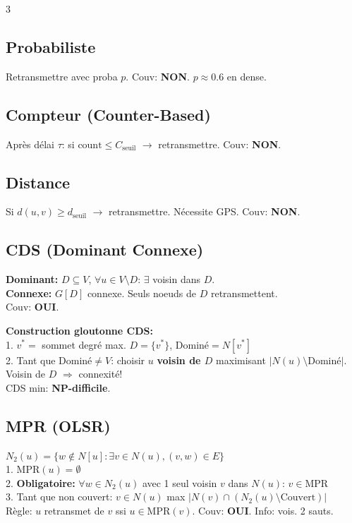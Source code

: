 \documentclass[a4paper,4pt]{article}
\begin{document}
\begin{multicols}{3}
\subsection{Probabiliste}
Retransmettre avec proba $p$. Couv: \textbf{NON}. $p\approx 0.6$ en dense.

\subsection{Compteur (Counter-Based)}
Apr\`es d\'elai $\tau$: si $\text{count}\leq C_{\text{seuil}}$ $\to$ retransmettre. Couv: \textbf{NON}.

\subsection{Distance}
Si $d(u,v)\geq d_{\text{seuil}}$ $\to$ retransmettre. N\'ecessite GPS. Couv: \textbf{NON}.

\subsection{CDS (Dominant Connexe)}
\textbf{Dominant:} $D\subseteq V$, $\forall u\in V\setminus D$: $\exists$ voisin dans $D$.\\
\textbf{Connexe:} $G[D]$ connexe. Seuls noeuds de $D$ retransmettent.\\
Couv: \textbf{OUI}.

\textbf{Construction gloutonne CDS:}\\
1. $v^*=$ sommet degr\'e max. $D=\{v^*\}$, Domin\'e$=N[v^*]$\\
2. Tant que Domin\'e$\neq V$: choisir $u$ \textbf{voisin de $D$} maximisant $|N(u)\setminus\text{Domin\'e}|$. Voisin de $D$ $\Rightarrow$ connexit\'e!\\
CDS min: \textbf{NP-difficile}.

\subsection{MPR (OLSR)}
$N_2(u)=\{w\notin N[u]: \exists v\in N(u), (v,w)\in E\}$\\
1. $\text{MPR}(u)=\emptyset$\\
2. \textbf{Obligatoire:} $\forall w\in N_2(u)$ avec 1 seul voisin $v$ dans $N(u)$: $v\in$MPR\\
3. Tant que non couvert: $v\in N(u)$ max $|N(v)\cap(N_2(u)\setminus\text{Couvert})|$\\
R\`egle: $u$ retransmet de $v$ ssi $u\in\text{MPR}(v)$. Couv: \textbf{OUI}. Info: vois. 2 sauts.


\end{multicols}
\end{document}
